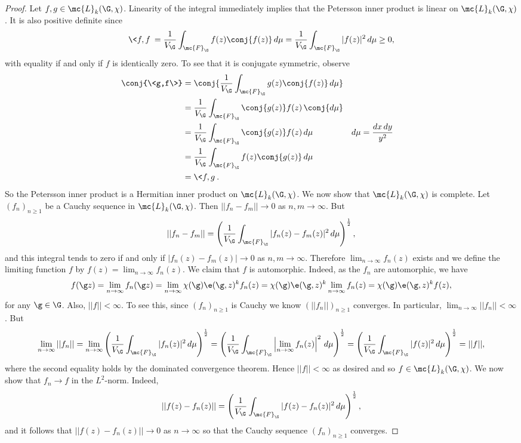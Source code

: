     \begin{proof}
      Let $f,g \in \mc{L}_{k}(\G,\chi)$. Linearity of the integral immediately implies that the Petersson inner product is linear on $\mc{L}_{k}(\G,\chi)$. It is also positive definite since
      \[
        \<f,f\> = \frac{1}{V_{\G}}\int_{\mc{F}_{\G}}f(z)\conj{f(z)}\,d\mu = \frac{1}{V_{\G}}\int_{\mc{F}_{\G}}|f(z)|^{2}\,d\mu \ge 0,
      \]
      with equality if and only if $f$ is identically zero. To see that it is conjugate symmetric, observe
      \begin{align*}
        \conj{\<g,f\>} &= \conj{\frac{1}{V_{\G}}\int_{\mc{F}_{\G}}g(z)\conj{f(z)}\,d\mu} \\
        &= \frac{1}{V_{\G}}\int_{\mc{F}_{\G}}\conj{g(z)}f(z)\,\conj{d\mu} \\
        &= \frac{1}{V_{\G}}\int_{\mc{F}_{\G}}\conj{g(z)}f(z)\,d\mu && \text{$d\mu = \frac{dx\,dy}{y^{2}}$} \\
        &= \frac{1}{V_{\G}}\int_{\mc{F}_{\G}}f(z)\conj{g(z)}\,d\mu \\
        &= \<f,g\>.
      \end{align*}
      So the Petersson inner product is a Hermitian inner product on $\mc{L}_{k}(\G,\chi)$. We now show that $\mc{L}_{k}(\G,\chi)$ is complete. Let $(f_{n})_{n \ge 1}$ be a Cauchy sequence in $\mc{L}_{k}(\G,\chi)$. Then $||f_{n}-f_{m}|| \to 0$ as $n,m \to \infty$. But
      \[
        ||f_{n}-f_{m}|| = \left(\frac{1}{V_{\G}}\int_{\mc{F}_{\G}}|f_{n}(z)-f_{m}(z)|^{2}\,d\mu\right)^{\frac{1}{2}},
      \]
      and this integral tends to zero if and only if $|f_{n}(z)-f_{m}(z)| \to 0$ as $n,m \to \infty$. Therefore $\lim_{n \to \infty}f_{n}(z)$ exists and we define the limiting function $f$ by $f(z) = \lim_{n \to \infty}f_{n}(z)$. We claim that $f$ is automorphic. Indeed, as the $f_{n}$ are automorphic, we have
      \[
        f(\g z) = \lim_{n \to \infty}f_{n}(\g z) = \lim_{n \to \infty}\chi(\g)\e(\g,z)^{k}f_{n}(z) = \chi(\g)\e(\g,z)^{k}\lim_{n \to \infty}f_{n}(z) = \chi(\g)\e(\g,z)^{k}f(z),
      \]
      for any $\g \in \G$. Also, $||f|| < \infty$. To see this, since $(f_{n})_{n \ge 1}$ is Cauchy we know $(||f_{n}||)_{n \ge 1}$ converges. In particular, $\lim_{n \to \infty}||f_{n}|| < \infty$. But
      \[
        \lim_{n \to \infty}||f_{n}|| = \lim_{n \to \infty}\left(\frac{1}{V_{\G}}\int_{\mc{F}_{\G}}|f_{n}(z)|^{2}\,d\mu\right)^{\frac{1}{2}} = \left(\frac{1}{V_{\G}}\int_{\mc{F}_{\G}}\left|\lim_{n \to \infty}f_{n}(z)\right|^{2}\,d\mu\right)^{\frac{1}{2}} = \left(\frac{1}{V_{\G}}\int_{\mc{F}_{\G}}|f(z)|^{2}\,d\mu\right)^{\frac{1}{2}} = ||f||,
      \]
      where the second equality holds by the dominated convergence theorem. Hence $||f|| < \infty$ as desired and so $f \in \mc{L}_{k}(\G,\chi)$. We now show that $f_{n} \to f$ in the $L^{2}$-norm. Indeed,
      \[
        ||f(z)-f_{n}(z)|| = \left(\frac{1}{V_{\G}}\int_{\mc{F}_{\G}}|f(z)-f_{n}(z)|^{2}\,d\mu\right)^{\frac{1}{2}},
      \]
      and it follows that $||f(z)-f_{n}(z)|| \to 0$ as $n \to \infty$ so that the Cauchy sequence $(f_{n})_{n \ge 1}$ converges.
    \end{proof}

